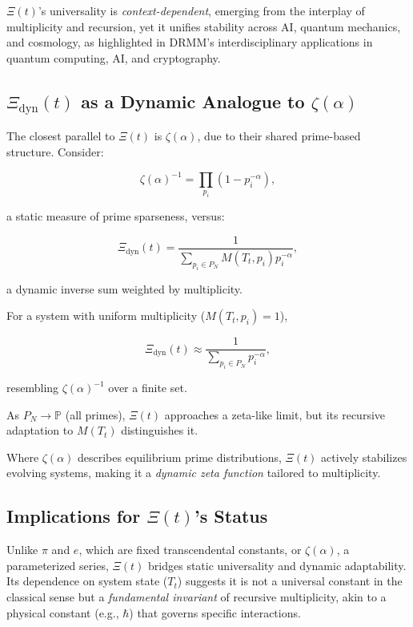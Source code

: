 \documentclass{article}
\theoremstyle{plain}
\begin{document}
\(\Xi(t) \)'s universality is \textit{context-dependent}, emerging from the interplay of multiplicity and recursion, yet it unifies stability across AI, quantum mechanics, and cosmology, as highlighted in DRMM's interdisciplinary applications in quantum computing, AI, and cryptography.

\subsection{\(\Xi_{\text{dyn}}(t)\) as a Dynamic Analogue to \( \zeta(\alpha) \)}

The closest parallel to \(\Xi(t) \) is \( \zeta(\alpha) \), due to their shared prime-based structure. Consider:

\[
\zeta(\alpha)^{-1} = \prod_{p_i} (1 - p_i^{-\alpha}),
\]

a static measure of prime sparseness, versus:

\[
\Xi_{\text{dyn}}(t) = \frac{1}{\sum_{p_i \in P_N} M(T_t, p_i) p_i^{-\alpha}},
\]

a dynamic inverse sum weighted by multiplicity.

For a system with uniform multiplicity (\( M(T_t, p_i) = 1 \)),

\[
\Xi_{\text{dyn}}(t) \approx \frac{1}{\sum_{p_i \in P_N} p_i^{-\alpha}},
\]

resembling \( \zeta(\alpha)^{-1} \) over a finite set.

As \( P_N \to \mathbb{P} \) (all primes), \(\Xi(t) \) approaches a zeta-like limit, but its recursive adaptation to \( M(T_t) \) distinguishes it. 

Where \( \zeta(\alpha) \) describes equilibrium prime distributions, \(\Xi(t) \) actively stabilizes evolving systems, making it a \textit{dynamic zeta function} tailored to multiplicity.

\subsection{Implications for \(\Xi(t) \)'s Status}

Unlike \( \pi \) and \( e \), which are fixed transcendental constants, or \( \zeta(\alpha) \), a parameterized series, \(\Xi(t) \) bridges static universality and dynamic adaptability. Its dependence on system state (\( T_t \)) suggests it is not a universal constant in the classical sense but a \textit{fundamental invariant} of recursive multiplicity, akin to a physical constant (e.g., \( \hbar \)) that governs specific interactions.
\end{document}
